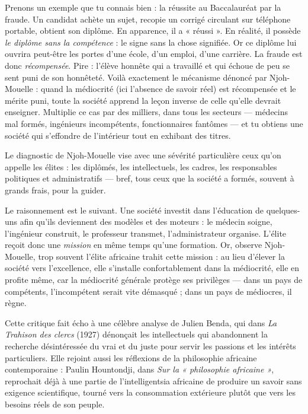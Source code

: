 \documentclass[11pt]{article}
\newcommand{\cle}[1]{{\popxbold\color{popdark}#1}}
\newcounter{popsec}
\newcounter{popsub}
\newcommand{\courssub}[1]{%
  \stepcounter{popsub}%
  \par\vspace{9pt}\noindent{\popxbold\fontsize{11.5}{13}\selectfont\color{popink}{\color{poporange}\thepopsec.\thepopsub}\hspace{6pt}#1}\par\nopagebreak\vspace{4pt}
}
\begin{document}
\begin{exemplebox}
Prenons un exemple que tu connais bien : la réussite au Baccalauréat par la fraude. Un candidat achète un sujet, recopie un corrigé circulant sur téléphone portable, obtient son diplôme. En apparence, il a « réussi ». En réalité, il possède \emph{le diplôme sans la compétence} : le signe sans la chose signifiée. Or ce diplôme lui ouvrira peut-être les portes d'une école, d'un emploi, d'une carrière. La fraude est donc \emph{récompensée}. Pire : l'élève honnête qui a travaillé et qui échoue de peu se sent puni de son honnêteté. Voilà exactement le mécanisme dénoncé par Njoh-Mouelle : quand la médiocrité (ici l'absence de savoir réel) est récompensée et le mérite puni, toute la société apprend la leçon inverse de celle qu'elle devrait enseigner. Multiplie ce cas par des milliers, dans tous les secteurs — médecins mal formés, ingénieurs incompétents, fonctionnaires fantômes — et tu obtiens une société qui s'effondre de l'intérieur tout en exhibant des titres.
\end{exemplebox}

\courssub{La responsabilité des élites : la trahison des guides}

Le diagnostic de Njoh-Mouelle vise avec une sévérité particulière ceux qu'on appelle les \cle{élites} : les diplômés, les intellectuels, les cadres, les responsables politiques et administratifs — bref, tous ceux que la société a formés, souvent à grands frais, pour la guider.

Le raisonnement est le suivant. Une société investit dans l'éducation de quelques-uns afin qu'ils deviennent des modèles et des moteurs : le médecin soigne, l'ingénieur construit, le professeur transmet, l'administrateur organise. L'élite reçoit donc une \emph{mission} en même temps qu'une formation. Or, observe Njoh-Mouelle, trop souvent l'élite africaine trahit cette mission : au lieu d'élever la société vers l'excellence, elle s'installe confortablement dans la médiocrité, elle en profite même, car la médiocrité générale protège ses privilèges — dans un pays de compétents, l'incompétent serait vite démasqué ; dans un pays de médiocres, il règne.

Cette critique fait écho à une célèbre analyse de Julien Benda, qui dans \emph{La Trahison des clercs} (1927) dénonçait les intellectuels qui abandonnent la recherche désintéressée du vrai et du juste pour servir les passions et les intérêts particuliers. Elle rejoint aussi les réflexions de la philosophie africaine contemporaine : Paulin Hountondji, dans \emph{Sur la « philosophie africaine »}, reprochait déjà à une partie de l'intelligentsia africaine de produire un savoir sans exigence scientifique, tourné vers la consommation extérieure plutôt que vers les besoins réels de son peuple.
\end{document}
